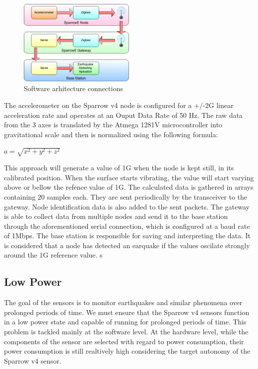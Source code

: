 \begin{figure}[ht] \centering
  \includegraphics[width=0.5\textwidth]{img/software-architecture.png}
  \caption{Software arhitecture connections}
\end{figure}

The accelerometer on the Sparrow v4 node is configured for a +/-2G linear acceleration rate and operates at an Ouput Data Rate of 50 Hz. 
The raw data from the 3 axes is translated by the Atmega 1281V microcontroller into gravitational scale and then is normalized using the following formula:

$ a = \sqrt{x^2+y^2+z^2}$

This approach will generate a value of 1G when the node is kept still, in its calibrated position. When the surface starts vibrating, the value will start varying 
above or bellow the refence value of 1G. The calculated data is gathered in arrays containing 20 samples each. They are sent periodically by the transceiver to the 
gateway. Node identification data is also added to the sent packets. The gateway is able to collect data from multiple nodes and send it to the base station through
the aforementioned serial connection, which is configured at a baud rate of 1Mbps. The base station is responsible for saving and interpreting the data. 
It is considered that a node has detected an earquake if the values oscilate strongly around the 1G reference value.
s
\subsection{Low Power}

The goal of the sensors is to monitor earthquakes and similar phenomena over prolonged periods of time. We must ensure that the Sparrow v4 sensors function in a low power
state and capable of running for prolonged periods of time. This problem is tackled mainly at the software level. At the hardware level, while the components of the sensor 
are selected with regard to power consumption, their power consumption is still realtively high considering the target autonomy of the Sparrow v4 sensor.

